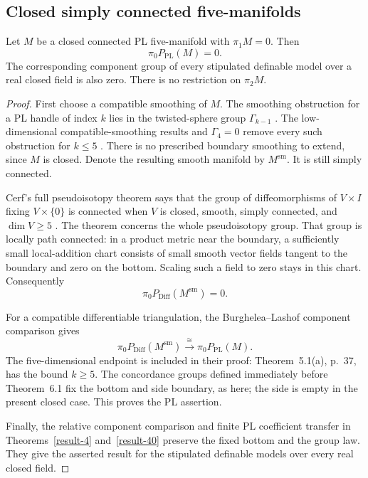 \subsection{Closed simply connected five-manifolds}

\begin{theorem}
\label{thm:simply-connected-five-components}
Let $M$ be a closed connected PL five-manifold with $\pi_1M=0$.
Then
\[
                         \pi_0P_{\mathrm{PL}}(M)=0.
\]
The corresponding component group of every stipulated definable model
over a real closed field is also zero.  There is no restriction on
$\pi_2M$.
\end{theorem}

\begin{proof}
First choose a compatible smoothing of $M$.  The smoothing
obstruction for a PL handle of index $k$ lies in the twisted-sphere
group $\Gamma_{k-1}$
\cite[Essay~IV, Appendix~B, p.~211]{KirbySiebenmann1977}.
The low-dimensional compatible-smoothing results and
$\Gamma_4=0$ remove every such obstruction for $k\le5$
\cite[Essay~I, p.~39; Essay~IV, p.~200]{KirbySiebenmann1977}.
There is no prescribed boundary smoothing to extend, since $M$ is
closed.  Denote the resulting smooth manifold by $M^{\mathrm{sm}}$.
It is still simply connected.

Cerf's full pseudoisotopy theorem says that the group of
diffeomorphisms of $V\times I$ fixing $V\times\{0\}$ is connected
when $V$ is closed, smooth, simply connected, and
$\dim V\ge5$
\cite[Introduction, Definition~2 and Theorem~0, pp.~7--8]{Cerf1970}.
The theorem concerns the whole pseudoisotopy group.
That group is locally path connected: in a product metric near
the boundary, a sufficiently small local-addition chart consists
of small smooth vector fields tangent to the boundary and zero
on the bottom.  Scaling such a field to zero stays in this chart.
Consequently
\[
                        \pi_0P_{\mathrm{Diff}}(M^{\mathrm{sm}})=0.
\]

For a compatible differentiable triangulation, the
Burghelea--Lashof component comparison
\cite[Theorem~6.1, pp.~41--43]{BurgheleaLashof1974II} gives
\[
 \pi_0P_{\mathrm{Diff}}(M^{\mathrm{sm}})
       \xrightarrow{\ \cong\ }\pi_0P_{\mathrm{PL}}(M).
\]
The five-dimensional endpoint is included in their proof:
Theorem~5.1(a), p.~37, has the bound $k\ge5$.
The concordance groups defined immediately before Theorem~6.1
fix the bottom and side boundary, as here; the side is empty in
the present closed case.  This proves the PL assertion.

Finally, the relative component comparison and finite PL
coefficient transfer in
Theorems~\ref{result-4} and~\ref{result-40} preserve the fixed
bottom and the group law.  They give the asserted result for
the stipulated definable models over every real closed field.
\end{proof}

